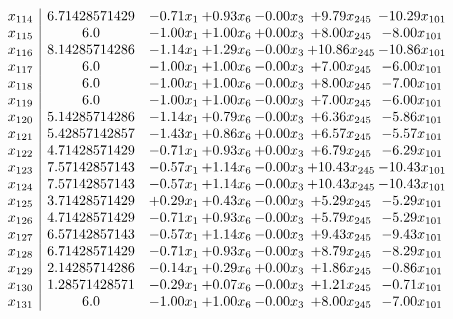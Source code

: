 \documentclass[8pt]{article}
\begin{document}
\[\begin{array}{c| c c@{\hskip 2pt} c@{\hskip 2pt} c@{\hskip 2pt} c@{\hskip 2pt} c@{\hskip 2pt} }
 x_{114}   &  6.71428571429 & -0.71 x_{1} & +  0.93 x_{6} & -0.00 x_{3} & +  9.79 x_{245} & -10.29 x_{101}\\
 x_{115}   &  6.0 & -1.00 x_{1} & +  1.00 x_{6} & +  0.00 x_{3} & +  8.00 x_{245} & -8.00 x_{101}\\
 x_{116}   &  8.14285714286 & -1.14 x_{1} & +  1.29 x_{6} & -0.00 x_{3} & + 10.86 x_{245} & -10.86 x_{101}\\
 x_{117}   &  6.0 & -1.00 x_{1} & +  1.00 x_{6} & -0.00 x_{3} & +  7.00 x_{245} & -6.00 x_{101}\\
 x_{118}   &  6.0 & -1.00 x_{1} & +  1.00 x_{6} & -0.00 x_{3} & +  8.00 x_{245} & -7.00 x_{101}\\
 x_{119}   &  6.0 & -1.00 x_{1} & +  1.00 x_{6} & -0.00 x_{3} & +  7.00 x_{245} & -6.00 x_{101}\\
 x_{120}   &  5.14285714286 & -1.14 x_{1} & +  0.79 x_{6} & -0.00 x_{3} & +  6.36 x_{245} & -5.86 x_{101}\\
 x_{121}   &  5.42857142857 & -1.43 x_{1} & +  0.86 x_{6} & +  0.00 x_{3} & +  6.57 x_{245} & -5.57 x_{101}\\
 x_{122}   &  4.71428571429 & -0.71 x_{1} & +  0.93 x_{6} & +  0.00 x_{3} & +  6.79 x_{245} & -6.29 x_{101}\\
 x_{123}   &  7.57142857143 & -0.57 x_{1} & +  1.14 x_{6} & -0.00 x_{3} & + 10.43 x_{245} & -10.43 x_{101}\\
 x_{124}   &  7.57142857143 & -0.57 x_{1} & +  1.14 x_{6} & -0.00 x_{3} & + 10.43 x_{245} & -10.43 x_{101}\\
 x_{125}   &  3.71428571429 & +  0.29 x_{1} & +  0.43 x_{6} & -0.00 x_{3} & +  5.29 x_{245} & -5.29 x_{101}\\
 x_{126}   &  4.71428571429 & -0.71 x_{1} & +  0.93 x_{6} & -0.00 x_{3} & +  5.79 x_{245} & -5.29 x_{101}\\
 x_{127}   &  6.57142857143 & -0.57 x_{1} & +  1.14 x_{6} & -0.00 x_{3} & +  9.43 x_{245} & -9.43 x_{101}\\
 x_{128}   &  6.71428571429 & -0.71 x_{1} & +  0.93 x_{6} & -0.00 x_{3} & +  8.79 x_{245} & -8.29 x_{101}\\
 x_{129}   &  2.14285714286 & -0.14 x_{1} & +  0.29 x_{6} & +  0.00 x_{3} & +  1.86 x_{245} & -0.86 x_{101}\\
 x_{130}   &  1.28571428571 & -0.29 x_{1} & +  0.07 x_{6} & -0.00 x_{3} & +  1.21 x_{245} & -0.71 x_{101}\\
 x_{131}   &  6.0 & -1.00 x_{1} & +  1.00 x_{6} & -0.00 x_{3} & +  8.00 x_{245} & -7.00 x_{101}\\

\end{array}\]
\end{document}
